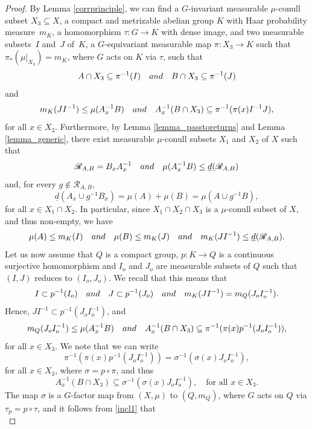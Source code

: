 \documentclass[11pt]{article}
\numberwithin{equation}{section}
\let\mathcal\mathscr
\newcommand{\cR}{\mathcal{R}}
\newcommand{\qand}{\quad\textup{and}\quad}
\theoremstyle{plain}
\theoremstyle{definition}
\begin{document}
\begin{proof}
By Lemma \ref{corrprinciple}, we can find a $G$-invariant measurable $\mu$-conull subset \hbox{$X_3 \subseteq X$}, a compact and
metrizable abelian group $K$ with Haar probability measure~$m_K$, a homomorphism $\tau : G \to K$ with dense image,
and two measurable subsets~$I$ and~$J$ of~$K$, a $G$-equivariant measurable map $\pi : X_3 \to K$ such that
$\pi_*(\mu |_{X_3}) = m_K$, where $G$ acts on $K$ via $\tau$, such that
\begin{equation}
\label{incl1}
A \cap X_3 \subseteq \pi^{-1}(I) \qand B \cap X_3 \subseteq \pi^{-1}(J)
\end{equation}
and
\[
m_K(JI^{-1}) \leq \mu(A_x^{-1}B)
\qand
A_x^{-1}(B \cap X_3) \subseteq \pi^{-1}(\pi(x) I^{-1}J),
\]
for all $x \in X_3$. Furthermore, by Lemma \ref{lemma_passtoreturns} and Lemma \ref{lemma_generic}, there exist measurable
$\mu$-conull subsets $X_1$ and $X_2$ of $X$
such that
\[
\cR_{A,B} = B_x A_x^{-1} \qand \mu(A_x^{-1}B) \leq \underline{d}(\cR_{A,B})
\]
and, for every $g \notin \cR_{A,B}$,
\begin{equation}
\label{recall_overshoot}
\underline{d}(A_x \cup g^{-1}B_x) = \mu(A) + \mu(B) = \mu(A \cup g^{-1}B),
\end{equation}
for all $x \in X_1 \cap X_2$. In particular, since $X_1 \cap X_2 \cap X_3$ is a $\mu$-conull subset of $X$, and thus non-empty, we have
\[
\mu(A) \leq m_K(I) \qand \mu(B) \leq m_K(J) \qand m_K(JI^{-1}) \leq \underline{d}(\cR_{A,B}).
\]
Let us now assume that $Q$ is a compact group, $p : K \to Q$ is a continuous surjective homomorphism and $I_o$ and $J_o$ are
measurable subsets of $Q$ such that $(I,J)$ reduces to $(I_o,J_o)$. We recall that this means that
\[
I \subset p^{-1}(I_o) \qand J \subset p^{-1}(J_o) \qand m_K(JI^{-1}) = m_Q(J_o I_o^{-1}).
\]
Hence, $J I^{-1} \subset p^{-1}(J_o I_o^{-1})$, and
\[
m_Q(J_oI_o^{-1}) \leq \mu(A_x^{-1}B)
\qand
A_x^{-1}(B \cap X_3) \subseteq \pi^{-1}(\pi(x) p^{-1}(J_o I_o^{-1})),
\]
for all $x \in X_3$.
We note that we can write
\[
\pi^{-1}(\pi(x) p^{-1}(J_o I_o^{-1})) = \sigma^{-1}(\sigma(x) J_o I_o^{-1}),
\]
for all $x \in X_3$, where $\sigma = p \circ \pi$, and thus
\begin{equation}
A_x^{-1}(B \cap X_3) \subseteq \sigma^{-1}(\sigma(x) J_o I_o^{-1}), \quad \textrm{for all $x \in X_3$}.
\end{equation}
The map $\sigma$ is a $G$-factor map from $(X,\mu)$ to $(Q,m_Q)$, where $G$ acts on
$Q$ via $\tau_p = p \circ \tau$, and it follows from \eqref{incl1} that
\begin{equation}

\end{equation}
\end{proof}
\end{document}
